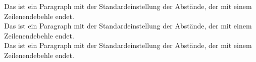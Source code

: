 \documentclass[a5paper]{article}
\begin{document}
Das ist ein Paragraph mit der Standardeinstellung der Abstände, der mit einem Zeilenendebehle endet.\\

Das ist ein Paragraph mit der Standardeinstellung der Abstände, der mit einem Zeilenendebehle endet.\\

Das ist ein Paragraph mit der Standardeinstellung der Abstände, der mit einem Zeilenendebehle endet.\\





\end{document}
